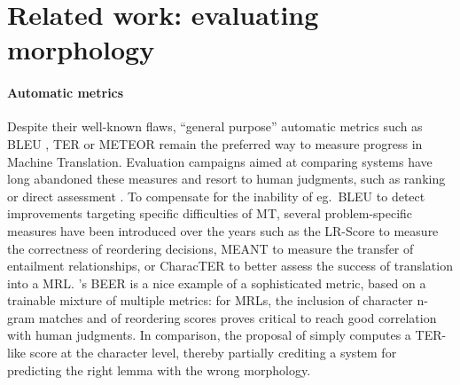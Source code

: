 \documentclass[11pt,letterpaper,final,nohyperref]{article}
\begin{document}
\section{Related work: evaluating morphology \label{sec:related}}

\paragraph{Automatic metrics}
Despite their well-known flaws, ``general purpose'' automatic metrics such as BLEU \citep{Papineni02bleu}, TER \citep{Snover06study} or METEOR \citep{Banerjee05meteor} remain the preferred way to measure progress in Machine Translation. Evaluation campaigns aimed at comparing systems have long abandoned these measures and resort to human judgments, such as ranking \cite{Callisonburch07meta} or direct assessment \citep{Bojar16findings}. To compensate for the inability of eg.~BLEU to detect improvements targeting specific difficulties of MT, several problem-specific measures have been introduced over the years such as the LR-Score \citep{Birch10lrscore} to measure the correctness of reordering decisions, MEANT \citep{Lo11meant} to measure the transfer of entailment relationships, or CharacTER \citep{Wang16character} to better assess the success of translation into a MRL. 
\citet{Stanojevic14beer}'s BEER is a nice example of a sophisticated metric, based on a trainable mixture of multiple metrics: for MRLs, the inclusion of character n-gram matches and of reordering scores proves critical to reach good correlation with human judgments. In comparison, the proposal of \citet{Wang16character} simply computes a TER-like score at the character level, thereby partially crediting a system for predicting the right lemma with the wrong morphology.
\end{document}

